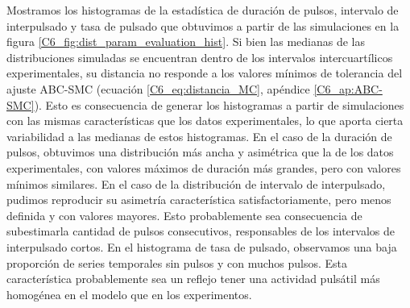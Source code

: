 \documentclass[./main.tex]{subfiles}
\begin{document}
Mostramos los histogramas de la estadística de duración de pulsos, intervalo de interpulsado y tasa de pulsado que obtuvimos a partir de las simulaciones en la figura \ref{C6_fig:dist_param_evaluation_hist}. Si bien las medianas de las distribuciones simuladas se encuentran dentro de los intervalos intercuartílicos experimentales, su distancia no responde a los valores mínimos de tolerancia del ajuste ABC-SMC (ecuación \ref{C6_eq:distancia_MC}, apéndice \ref{C6_ap:ABC-SMC}). Esto es consecuencia de generar los histogramas a partir de simulaciones con las mismas características que los datos experimentales, lo que aporta cierta variabilidad a las medianas de estos histogramas. En el caso de la duración de pulsos, obtuvimos una distribución más ancha y asimétrica que la de los datos experimentales, con valores máximos de duración más grandes, pero con valores mínimos similares. En el caso de la distribución de intervalo de interpulsado, pudimos  reproducir su asimetría característica satisfactoriamente, pero menos definida y con valores mayores. Esto probablemente sea consecuencia de subestimarla cantidad de pulsos consecutivos, responsables de los intervalos de interpulsado cortos. En el histograma de tasa de pulsado, observamos una baja proporción de series temporales sin pulsos y con muchos pulsos. Esta característica probablemente sea un reflejo tener una actividad pulsátil más homogénea en el modelo que en los experimentos. 
\end{document}
